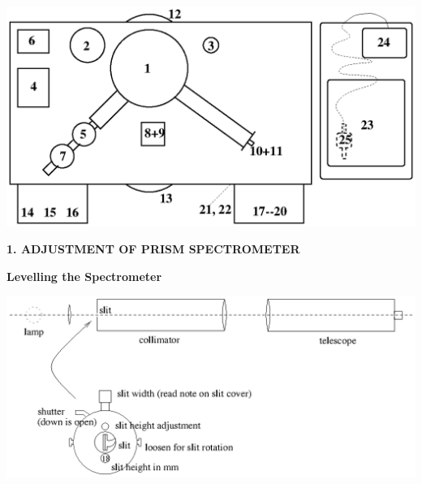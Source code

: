 \documentclass[12pt]{article}
\begin{document}
\begin{center}
\includegraphics{ap3labbench.ps}
\end{center}

\newpage





{\bf 1. ADJUSTMENT OF PRISM SPECTROMETER}

{\bf Levelling the Spectrometer}

\begin{center}
\includegraphics{ap3labspec0.ps}
\end{center}
\end{document}
